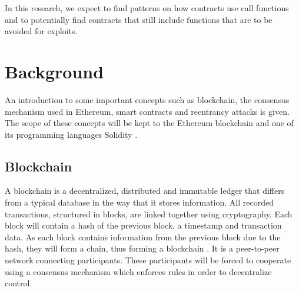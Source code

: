\documentclass[sigconf]{acmart}
\begin{document}
In this research, we expect to find patterns on how contracts use call functions and to potentially find contracts that still include functions that are to be avoided for exploits.
\section{Background}
An introduction to some important concepts such as blockchain, the consensus mechanism used in Ethereum, smart contracts and reentrancy attacks is given. The scope of these concepts will be kept to the Ethereum blockchain and one of its programming languages Solidity \cite{solidity}.
\subsection{Blockchain}
A blockchain is a decentralized, distributed and immutable ledger that differs from a typical database in the way that it stores information. All recorded transactions, structured in blocks, are linked together using cryptography. Each block will contain a hash of the previous block, a timestamp and transaction data. As each block contains information from the previous block due to the hash, they will form a chain, thus forming a blockchain \cite{article}. It is a peer-to-peer network connecting participants. These participants will be forced to cooperate using a consensus mechanism which enforces rules in order to decentralize control.
\end{document}
